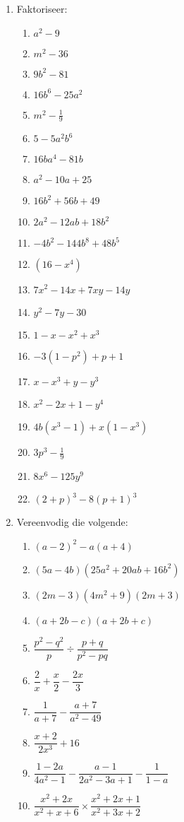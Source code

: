 \begin{eocexercises}{}
\begin{enumerate}[itemsep=5pt, label=\textbf{\arabic*}. ]
\item Faktoriseer:
\begin{multicols}{2}
\begin{enumerate}[itemsep=5pt, label=\textbf{\alph*}. ] 
\item ${a}^{2}-9$
\item ${m}^{2}-36$
\item $9{b}^{2}-81$
\item $16{b}^{6}-25{a}^{2}$
\item ${m}^{2}-\frac{1}{9}$
\item $5-5{a}^{2}{b}^{6}$
\item $16b{a}^{4}-81b$
\item ${a}^{2}-10a+25$
\item $16{b}^{2}+56b+49$
\item $2{a}^{2}-12ab+18{b}^{2}$
\item $-4{b}^{2}-144{b}^{8}+48{b}^{5}$
\item $(16-{x}^{4})$
\item ${7x}^{2}-14x+7xy-14y$
\item ${y}^{2}-7y-30$
\item $1-x-{x}^{2}+{x}^{3}$
\item $-3(1-{p}^{2})+p+1$
\item $x-x^{3} + y - y^{3}$
\item $x^{2} - 2x + 1 - y^{4}$
\item $4b(x^{3} - 1) + x(1-x^{3})$
\item $3p^{3} - \frac{1}{9}$
\item $8x^6-125y^9$
\item $(2+p)^3- 8(p+1)^3$
\end{enumerate}
\end{multicols}


\item Vereenvodig die volgende:
\begin{multicols}{2}
\begin{enumerate}[itemsep=5pt, label=\textbf{\alph*}. ] 

\item ${(a-2)}^{2}-a(a+4)$
\item $(5a-4b)(25{a}^{2}+20ab+16{b}^{2})$
\item $(2m-3)(4{m}^{2}+9)(2m+3)$
\item $(a+2b-c)(a+2b+c)$
\item $\dfrac{{p}^{2}-{q}^{2}}{p}÷\dfrac{p+q}{{p}^{2}-pq}$
\item $\dfrac{2}{x}+\dfrac{x}{2}-\dfrac{2x}{3}$
\item $\dfrac{1}{a+7}-\dfrac{a+7}{a^{2}-49}$
\item $\dfrac{x+2}{2x^{3}} + 16$
\item $\dfrac{1-2a}{4a^{2} -1} - \dfrac{a-1}{2a^{2}-3a+1} - \dfrac{1}{1-a}$
\item $\dfrac{x^{2} + 2x}{x^{2}+ x + 6} \times \dfrac{x^{2} + 2x + 1}{x^{2} + 3x +2}$
\end{enumerate}
\end{multicols}



\end{enumerate}
\end{eocexercises}
